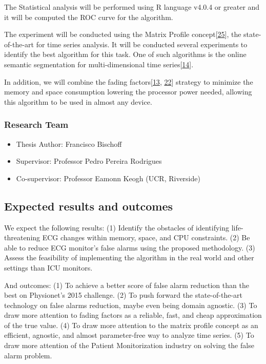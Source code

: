 \documentclass[runningheads]{llncs}
\providecommand{\tightlist}{%
  \setlength{\itemsep}{0pt}\setlength{\parskip}{0pt}}
\begin{document}
The Statistical analysis will be performed using R language v4.0.4 or
greater and it will be computed the ROC curve for the algorithm.

The experiment will be conducted using the Matrix Profile
concept{[}\protect\hyperlink{ref-yeh2016}{25}{]}, the state-of-the-art
for time series analysis. It will be conducted several experiments to
identify the best algorithm for this task. One of such algorithms is the
online semantic segmentation for multi-dimensional time
series{[}\protect\hyperlink{ref-gharghabi2018}{14}{]}.

In addition, we will combine the fading
factors{[}\protect\hyperlink{ref-Gama2013}{13},
\protect\hyperlink{ref-Rodrigues2010}{22}{]} strategy to minimize the
memory and space consumption lowering the processor power needed,
allowing this algorithm to be used in almost any device.

\hypertarget{research-team}{%
\subsubsection{Research Team}\label{research-team}}

\begin{itemize}
\tightlist
\item
  Thesis Author: Francisco Bischoff
\item
  Supervisor: Professor Pedro Pereira Rodrigues
\item
  Co-supervisor: Professor Eamonn Keogh (UCR, Riverside)
\end{itemize}

\hypertarget{expected-results-and-outcomes}{%
\subsection{Expected results and
outcomes}\label{expected-results-and-outcomes}}

We expect the following results: (1) Identify the obstacles of
identifying life-threatening ECG changes within memory, space, and CPU
constraints. (2) Be able to reduce ECG monitor's false alarms using the
proposed methodology. (3) Assess the feasibility of implementing the
algorithm in the real world and other settings than ICU monitors.

And outcomes: (1) To achieve a better score of false alarm reduction
than the best on Physionet's 2015 challenge. (2) To push forward the
state-of-the-art technology on false alarms reduction, maybe even being
domain agnostic. (3) To draw more attention to fading factors as a
reliable, fast, and cheap approximation of the true value. (4) To draw
more attention to the matrix profile concept as an efficient, agnostic,
and almost parameter-free way to analyze time series. (5) To draw more
attention of the Patient Monitorization industry on solving the false
alarm problem.
\end{document}
